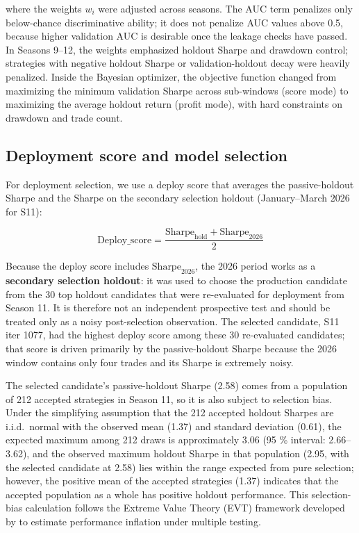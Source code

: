 \documentclass[analytics,article,submit,pdftex,moreauthors]{Definitions/mdpi}
\begin{document}
where the weights \(w_i\) were adjusted across seasons. The AUC term penalizes only below-chance discriminative ability; it does not penalize AUC values above 0.5, because higher validation AUC is desirable once the leakage checks have passed. In Seasons 9--12, the weights emphasized holdout Sharpe and drawdown control; strategies with negative holdout Sharpe or validation-holdout decay were heavily penalized. Inside the Bayesian optimizer, the objective function changed from maximizing the minimum validation Sharpe across sub-windows (score mode) to maximizing the average holdout return (profit mode), with hard constraints on drawdown and trade count.

\subsection{Deployment score and model selection}\label{deployment-score-and-model-selection}

For deployment selection, we use a deploy score that averages the passive-holdout Sharpe and the Sharpe on the secondary selection holdout (January--March 2026 for S11):

\[\text{Deploy\_score} = \frac{\text{Sharpe}_{\text{hold}} + \text{Sharpe}_{\text{2026}}}{2}\]

Because the deploy score includes \(\text{Sharpe}_{\text{2026}}\), the 2026 period works as a \textbf{secondary selection holdout}: it was used to choose the production candidate from the 30 top holdout candidates that were re-evaluated for deployment from Season 11. It is therefore not an independent prospective test and should be treated only as a noisy post-selection observation. The selected candidate, S11 iter 1077, had the highest deploy score among these 30 re-evaluated candidates; that score is driven primarily by the passive-holdout Sharpe because the 2026 window contains only four trades and its Sharpe is extremely noisy.

The selected candidate's passive-holdout Sharpe (2.58) comes from a population of 212 accepted strategies in Season 11, so it is also subject to selection bias. Under the simplifying assumption that the 212 accepted holdout Sharpes are i.i.d.~normal with the observed mean (1.37) and standard deviation (0.61), the expected maximum among 212 draws is approximately 3.06 (95 \% interval: 2.66--3.62), and the observed maximum holdout Sharpe in that population (2.95, with the selected candidate at 2.58) lies within the range expected from pure selection; however, the positive mean of the accepted strategies (1.37) indicates that the accepted population as a whole has positive holdout performance. This selection-bias calculation follows the Extreme Value Theory (EVT) framework developed by \citep{bailey_2014} to estimate performance inflation under multiple testing.
\end{document}
